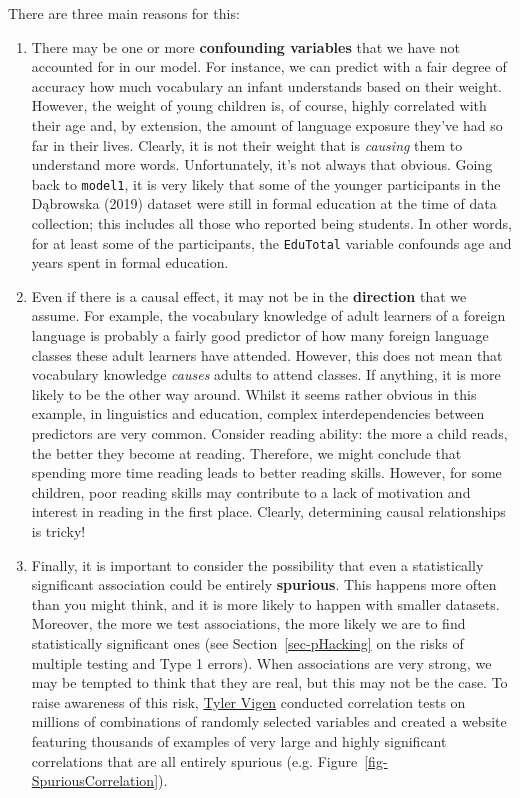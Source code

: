 \documentclass[
  letterpaper,
  DIV=11,
  numbers=noendperiod]{scrreprt}
\begin{document}
\begin{tcolorbox}
There are three main reasons for this:

\begin{enumerate}
\def\labelenumi{\arabic{enumi}.}
\item
  There may be one or more \textbf{confounding variables} that we have
  not accounted for in our model. For instance, we can predict with a
  fair degree of accuracy how much vocabulary an infant understands
  based on their weight. However, the weight of young children is, of
  course, highly correlated with their age and, by extension, the amount
  of language exposure they've had so far in their lives. Clearly, it is
  not their weight that is \emph{causing} them to understand more words.
  Unfortunately, it's not always that obvious. Going back to
  \texttt{model1}, it is very likely that some of the younger
  participants in the Dąbrowska (2019) dataset were still in formal
  education at the time of data collection; this includes all those who
  reported being students. In other words, for at least some of the
  participants, the \texttt{EduTotal} variable confounds age and years
  spent in formal education.
\item
  Even if there is a causal effect, it may not be in the
  \textbf{direction} that we assume. For example, the vocabulary
  knowledge of adult learners of a foreign language is probably a fairly
  good predictor of how many foreign language classes these adult
  learners have attended. However, this does not mean that vocabulary
  knowledge \emph{causes} adults to attend classes. If anything, it is
  more likely to be the other way around. Whilst it seems rather obvious
  in this example, in linguistics and education, complex
  interdependencies between predictors are very common. Consider reading
  ability: the more a child reads, the better they become at reading.
  Therefore, we might conclude that spending more time reading leads to
  better reading skills. However, for some children, poor reading skills
  may contribute to a lack of motivation and interest in reading in the
  first place. Clearly, determining causal relationships is tricky!
\item
  Finally, it is important to consider the possibility that even a
  statistically significant association could be entirely
  \textbf{spurious}. This happens more often than you might think, and
  it is more likely to happen with smaller datasets. Moreover, the more
  we test associations, the more likely we are to find statistically
  significant ones (see Section~\ref{sec-pHacking} on the risks of
  multiple testing and Type 1 errors). When associations are very
  strong, we may be tempted to think that they are real, but this may
  not be the case. To raise awareness of this risk,
  \href{https://tylervigen.com/about-spurious-correlations}{Tyler Vigen}
  conducted correlation tests on millions of combinations of randomly
  selected variables and created a website featuring thousands of
  examples of very large and highly significant correlations that are
  all entirely spurious (e.g. Figure~\ref{fig-SpuriousCorrelation}).


\end{enumerate}
\end{tcolorbox}
\end{document}
